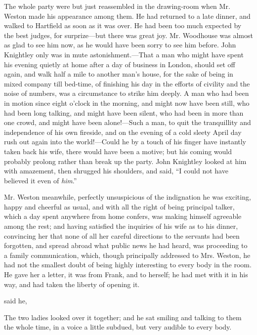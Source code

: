 The whole party were but just reassembled in the drawing-room when Mr. Weston made his appearance among them. He had returned to a late dinner, and walked to Hartfield as soon as it was over. He had been too much expected by the best judges, for surprize---but there was great joy. Mr. Woodhouse was almost as glad to see him now, as he would have been sorry to see him before. John Knightley only was in mute astonishment.---That a man who might have spent his evening quietly at home after a day of business in London, should set off again, and walk half a mile to another man's house, for the sake of being in mixed company till bed-time, of finishing his day in the efforts of civility and the noise of numbers, was a circumstance to strike him deeply. A man who had been in motion since eight o'clock in the morning, and might now have been still, who had been long talking, and might have been silent, who had been in more than one crowd, and might have been alone!---Such a man, to quit the tranquillity and independence of his own fireside, and on the evening of a cold sleety April day rush out again into the world!---Could he by a touch of his finger have instantly taken back his wife, there would have been a motive; but his coming would probably prolong rather than break up the party. John Knightley looked at him with amazement, then shrugged his shoulders, and said, “I could not have believed it even of {\em him}.”

Mr. Weston meanwhile, perfectly unsuspicious of the indignation he was exciting, happy and cheerful as usual, and with all the right of being principal talker, which a day spent anywhere from home confers, was making himself agreeable among the rest; and having satisfied the inquiries of his wife as to his dinner, convincing her that none of all her careful directions to the servants had been forgotten, and spread abroad what public news he had heard, was proceeding to a family communication, which, though principally addressed to Mrs. Weston, he had not the smallest doubt of being highly interesting to every body in the room. He gave her a letter, it was from Frank, and to herself; he had met with it in his way, and had taken the liberty of opening it.

 said he, 

The two ladies looked over it together; and he sat smiling and talking to them the whole time, in a voice a little subdued, but very audible to every body.

